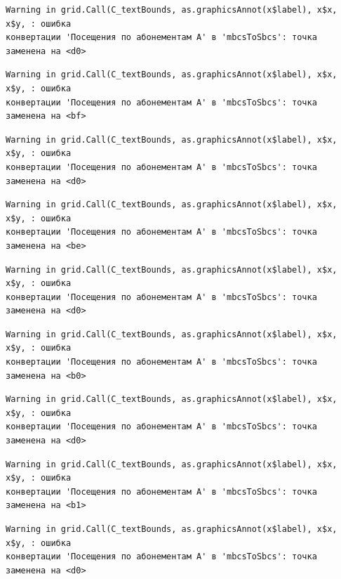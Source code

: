 \documentclass[
  letterpaper,
  DIV=11,
  numbers=noendperiod]{scrreprt}
\begin{document}
\begin{verbatim}
Warning in grid.Call(C_textBounds, as.graphicsAnnot(x$label), x$x, x$y, : ошибка
конвертации 'Посещения по абонементам А' в 'mbcsToSbcs': точка заменена на <d0>
\end{verbatim}

\begin{verbatim}
Warning in grid.Call(C_textBounds, as.graphicsAnnot(x$label), x$x, x$y, : ошибка
конвертации 'Посещения по абонементам А' в 'mbcsToSbcs': точка заменена на <bf>
\end{verbatim}

\begin{verbatim}
Warning in grid.Call(C_textBounds, as.graphicsAnnot(x$label), x$x, x$y, : ошибка
конвертации 'Посещения по абонементам А' в 'mbcsToSbcs': точка заменена на <d0>
\end{verbatim}

\begin{verbatim}
Warning in grid.Call(C_textBounds, as.graphicsAnnot(x$label), x$x, x$y, : ошибка
конвертации 'Посещения по абонементам А' в 'mbcsToSbcs': точка заменена на <be>
\end{verbatim}

\begin{verbatim}
Warning in grid.Call(C_textBounds, as.graphicsAnnot(x$label), x$x, x$y, : ошибка
конвертации 'Посещения по абонементам А' в 'mbcsToSbcs': точка заменена на <d0>
\end{verbatim}

\begin{verbatim}
Warning in grid.Call(C_textBounds, as.graphicsAnnot(x$label), x$x, x$y, : ошибка
конвертации 'Посещения по абонементам А' в 'mbcsToSbcs': точка заменена на <b0>
\end{verbatim}

\begin{verbatim}
Warning in grid.Call(C_textBounds, as.graphicsAnnot(x$label), x$x, x$y, : ошибка
конвертации 'Посещения по абонементам А' в 'mbcsToSbcs': точка заменена на <d0>
\end{verbatim}

\begin{verbatim}
Warning in grid.Call(C_textBounds, as.graphicsAnnot(x$label), x$x, x$y, : ошибка
конвертации 'Посещения по абонементам А' в 'mbcsToSbcs': точка заменена на <b1>
\end{verbatim}

\begin{verbatim}
Warning in grid.Call(C_textBounds, as.graphicsAnnot(x$label), x$x, x$y, : ошибка
конвертации 'Посещения по абонементам А' в 'mbcsToSbcs': точка заменена на <d0>
\end{verbatim}
\end{document}
